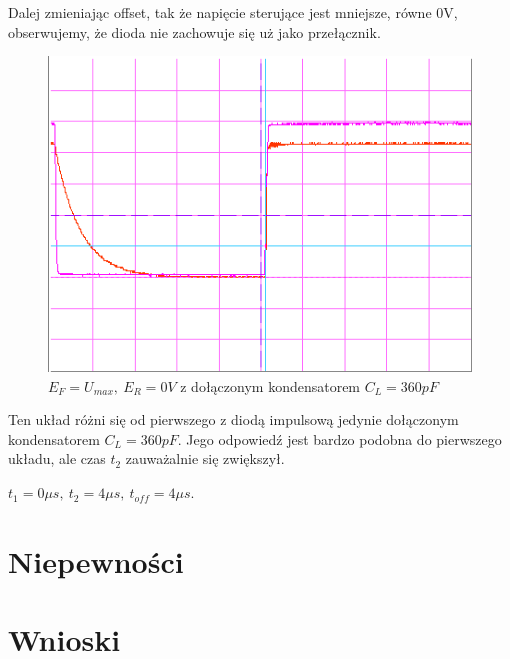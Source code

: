 \documentclass[a4paper,11pt]{article}
\begin{document}
Dalej zmieniając offset, tak że napięcie sterujące jest mniejsze, równe 0V, obserwujemy, że dioda nie zachowuje się uż jako przełącznik.

\begin{figure} [H]
  \begin{center}
    \includegraphics{../Obrazki_i_tekst/obrobione/31esciety.png}
    \caption{\( E_F = U_{max}, \ E_R = 0V \) z dołączonym kondensatorem \(C_L = 360 pF\)}
  \end{center}
\end{figure}

Ten układ różni się od pierwszego z diodą impulsową jedynie dołączonym kondensatorem \(C_L = 360 pF\). Jego odpowiedź jest bardzo podobna do pierwszego układu, ale czas \( t_2 \) zauważalnie się zwiększył.

\(t_1 = 0 \mu s,\ t_2 = 4 \mu s,\ t_{off} = 4 \mu s \).


\section{Niepewności}


\section{Wnioski}

\end{document}
